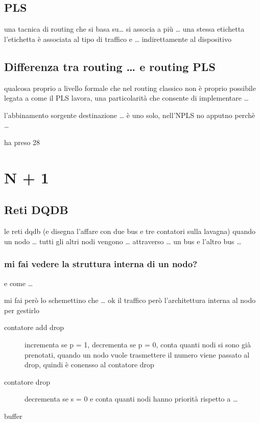 \documentclass[11pt]{article}
\begin{document}
\subsection{PLS}
\label{sec:org75e07d2}
una tacnica di routing che si basa su\ldots{}
si associa a più \ldots{} una stessa etichetta
l'etichetta è associata al tipo di traffico e \ldots{} indirettamente al dispositivo

\subsection{Differenza tra routing \ldots{} e routing PLS}
\label{sec:orgc85e4e5}
qualcosa proprio a livello formale che nel routing classico non è proprio possibile
legata a come il PLS lavora, una particolarità che consente di implementare \ldots{}

l'abbinamento sorgente destinazione \ldots{} è uno solo, nell'NPLS no apputno perchè \ldots{}

ha preso 28

\section{N + 1}
\label{sec:org5e534ad}
\subsection{Reti DQDB}
\label{sec:org710ca01}
le reti dqdb (e disegna l'affare con due bus e tre contatori sulla lavagna)
quando un nodo \ldots{} tutti gli altri nodi vengono \ldots{} attraverso \ldots{} un bus e l'altro bus \ldots{}

\subsubsection{mi fai vedere la struttura interna di un nodo?}
\label{sec:orged3199e}
e come \ldots{}

mi fai però lo schemettino che \ldots{}
ok il traffico però l'architettura interna al nodo per gestirlo
\begin{description}
\item[{contatore add drop}] incrementa se p = 1, decrementa se p = 0, conta quanti nodi si sono già prenotati, quando un nodo vuole trasmettere il numero viene passato al drop, quindi è conensso al contatore drop
\item[{contatore drop}] decrementa se s = 0 e conta quanti nodi hanno priorità rispetto a \ldots{}
\item[{buffer}] 
\end{description}
\end{document}
